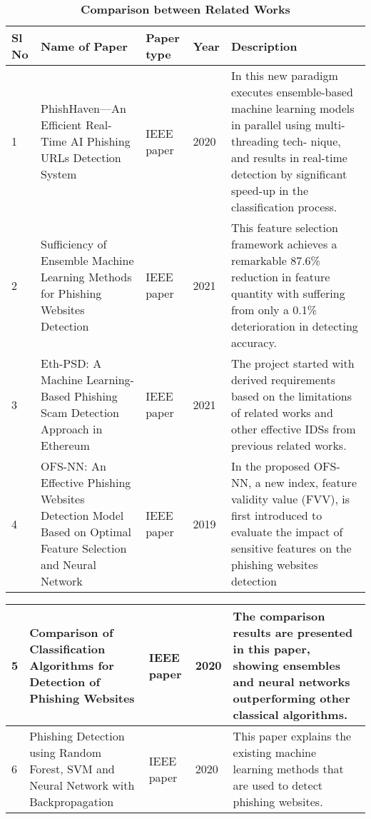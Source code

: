 {\small
\begin{table}[H]
	\centering
	\caption{\textbf{Comparison between Related Works}}
	\label{table }
	\begin{tabular}{|p{.6cm}|p{3.5cm}|p{1.2cm}|p{1cm}|p{5.7cm}|}
		\hline
		Sl No  & Name of Paper &	Paper type & Year & Description \\
		
		\hline
		1&
		PhishHaven—An Efficient Real-Time AI Phishing URLs Detection System
		& 
		IEEE paper & 
		2020 &
		In this new paradigm executes
ensemble-based machine learning models in parallel using multi-threading tech-
nique, and results in real-time detection by significant speed-up in the classification
process.
		
		\\
		\hline
		2 &
		Sufficiency of Ensemble Machine Learning Methods for Phishing Websites Detection
		
		&
		IEEE paper &
		2021&
		This feature selection framework achieves a remarkable 87.6\% reduction in feature quantity with suffering from only a 0.1\% deterioration in detecting accuracy.
		\\
		\hline
		3&
		Eth-PSD: A Machine Learning-Based Phishing Scam Detection Approach in Ethereum
		&
		IEEE paper
		&
		2021&
  The project started with derived requirements based on the limitations of related works and other effective IDSs from previous related works.


		\\
		\hline
		4&
		OFS-NN: An Effective Phishing Websites Detection Model Based on Optimal Feature Selection and Neural Network
		&	
		IEEE paper
		&
		
		2019& In the proposed OFS-NN, a new index, feature validity value (FVV), is first introduced to evaluate the impact of sensitive features on the phishing websites detection
		\\
		\hline
  
		
		
		
		
	\end{tabular}
\end{table}
\newpage
\begin{table}
	\centering
	\label{table }
	\begin{tabular}{|p{.6cm}|p{3.5cm}|p{1.2cm}|p{1cm}|p{5.7cm}|}
		
		\hline
  
		5&
		Comparison of Classification Algorithms for Detection of Phishing Websites
		&
		IEEE paper
		&
		2020&
		The comparison results are presented in this paper, showing ensembles and neural networks outperforming other classical algorithms.
		\\
		\hline	
		6 &
		Phishing Detection using Random Forest, SVM and Neural Network with Backpropagation &
		IEEE paper
		&
		2020 &
		This paper explains the existing machine learning methods that are used to detect phishing websites. 


\end{tabular}
\end{table}}
